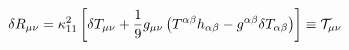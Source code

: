 \begin{equation}
\delta R_{\mu\nu} =\kappa_{11}^2\left[\delta T_{\mu\nu}
+\frac{1}{9}g_{\mu\nu}\left(T^{\alpha\beta}h_{\alpha\beta}-g^{\alpha\beta}
\delta T_{\alpha\beta} \right)  \right]\equiv{\cal T}_{\mu\nu}
\end{equation} 
